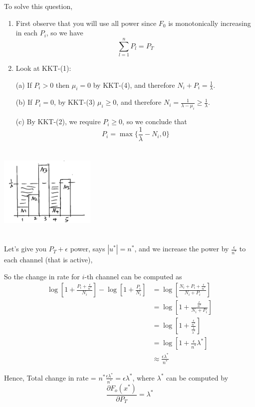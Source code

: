 To solve this question,
\begin{enumerate}
	\item First observe that you will use all power since $F_0$ is monotonically increasing in each $P_i$, so we have
	$$\sum^n_{l=1}P_l = P_T$$
	
	\item Look at KKT-(1):
	
	(a) If $P_i>0$ then $\mu_i = 0$ by KKT-(4), and therefore $N_i+P_i = \frac{1}{\lambda}$.
	
	(b) If $P_i= 0$, by KKT-(3) $\mu_i\ge 0$, and therefore $N_i = \frac{1}{\lambda - \mu_i}\geq \frac{1}{\lambda}$.
	
	(c) By KKT-(2), we require $P_i\geq 0$, so we conclude that 
	$$P_i = \max\{\frac{1}{\lambda}-N_i, 0 \}$$
\end{enumerate}
\begin{marginfigure}
	\centering
	\includegraphics[width=1.8in,height=1.8in]{figures/ch10/figure1204_2.png}
\end{marginfigure}

\vspace{0.3cm}
Let's give you $P_T+\epsilon$ power, says $|u^*| = n^*$, and we increase the power by $\frac{\epsilon}{n^*}$ to each channel (that is active),

So the change in rate for $i$-th channel can be computed as
\begin{align*}
\log[1+\frac{P_i+\frac{\epsilon}{n^*}}{N_i}] - \log[1+\frac{P_i}{N_i}] &= \log[\frac{N_i+P_i+\frac{\epsilon}{n^*}}{N_i+P_i}]\\
&= \log[1+\frac{\frac{\epsilon}{n^*}}{N_i+P_i}] \\
&= \log[1+\frac{\frac{\epsilon}{n^*}}{\frac{1}{\lambda^*}}]\\
&= \log[1+\frac{\epsilon}{n^*}\lambda^*]\\
&\approx \frac{\epsilon\lambda^*}{n^*} 
\end{align*}

Hence, Total change in rate  = $n^*\frac{\epsilon\lambda^*}{n^*} = \epsilon \lambda^*$, where $\lambda^*$ can be computed by
$$\frac{\partial F_o(x^*)}{\partial P_T} = \lambda^*$$

